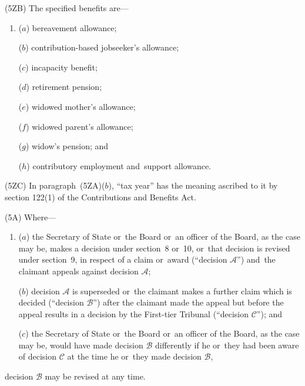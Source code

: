 \documentclass[12pt,a4paper]{article}
\begin{document}
(5ZB) The specified benefits are—
\begin{enumerate}\item[]
($a$) bereavement allowance;

($b$) contribution-based jobseeker’s allowance;

($c$) incapacity benefit;

($d$) retirement pension;

($e$) widowed mother’s allowance;

($f$) widowed parent’s allowance; 

($g$) widow’s pension;
% 
and

($h$) contributory employment and~support allowance.
\end{enumerate}

(5ZC) In paragraph~(5ZA)($b$), “tax year” has the meaning ascribed to it by section 122(1) of the Contributions and Benefits Act.

(5A) Where—
\begin{enumerate}\item[]
($a$) the Secretary of State or~the Board or~an officer of the Board, as the case may be, makes a decision under section~8 or~10, or~that decision is revised under section~9, in respect of a claim or~award (“decision $\mathcal{A}$”) and~the claimant appeals against decision $\mathcal{A}$;

($b$) decision $\mathcal{A}$ is superseded or~the claimant makes a further claim which is decided (“decision $\mathcal{B}$”) after the claimant made the appeal but before the appeal results in a decision by 
the First-tier Tribunal  %
(“decision $\mathcal{C}$”); and

($c$) the Secretary of State or~the Board or~an officer of the Board, as the case may be, would have made decision $\mathcal{B}$ differently if he or~they had been aware of decision $\mathcal{C}$ at the time he or~they made decision $\mathcal{B}$,
\end{enumerate}
decision $\mathcal{B}$ may be revised at any time.
\end{document}

